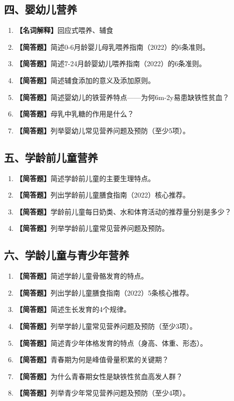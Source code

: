 {\subsection*{四、婴幼儿营养}

\begin{enumerate}[leftmargin=*, itemsep=8pt, start=16]
    \item \textbf{【名词解释】}回应式喂养、辅食
    \item \textbf{【简答题】}简述0-6月龄婴儿母乳喂养指南（2022）的6条准则。
    \item \textbf{【简答题】}简述7-24月龄婴幼儿喂养指南（2022）的6条准则。
    \item \textbf{【简答题】}简述辅食添加的意义及添加原则。
    \item \textbf{【简答题】}简述婴幼儿的铁营养特点——为何6m-2y易患缺铁性贫血？
    \item \textbf{【简答题】}母乳中乳糖的作用是什么？
    \item \textbf{【简答题】}列举婴幼儿常见营养问题及预防（至少5项）。
\end{enumerate}

\subsection*{五、学龄前儿童营养}

\begin{enumerate}[leftmargin=*, itemsep=8pt, start=23]
    \item \textbf{【简答题】}简述学龄前儿童的主要生理特点。
    \item \textbf{【简答题】}列出学龄前儿童膳食指南（2022）核心推荐。
    \item \textbf{【简答题】}学龄前儿童每日奶类、水和体育活动的推荐量分别是多少？
    \item \textbf{【简答题】}列举学龄前儿童常见营养问题及预防。
\end{enumerate}

\subsection*{六、学龄儿童与青少年营养}

\begin{enumerate}[leftmargin=*, itemsep=8pt, start=27]
    \item \textbf{【简答题】}简述学龄儿童骨骼发育的特点。
    \item \textbf{【简答题】}列出学龄儿童膳食指南（2022）5条核心推荐。
    \item \textbf{【简答题】}简述生长发育的4个规律。
    \item \textbf{【简答题】}列举学龄儿童常见营养问题及预防（至少3项）。
    \item \textbf{【简答题】}简述青少年体格发育的特点（身高、体重、形态）。
    \item \textbf{【简答题】}青春期为何是峰值骨量积累的关键期？
    \item \textbf{【简答题】}为什么青春期女性是缺铁性贫血高发人群？
    \item \textbf{【简答题】}列举青少年常见营养问题及预防（至少4项）。
\end{enumerate}

}
